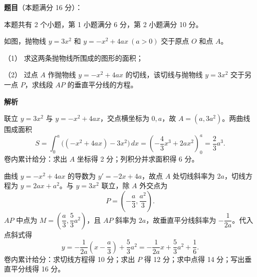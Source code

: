 \begin{answer}

\textbf{题目}（本题满分 16 分）：

本题共有 2 个小题，第 1 小题满分 6 分，第 2 小题满分 10 分。

如图，抛物线 $y=3x^2$ 和 $y=-x^2+4ax\ (a>0)$ 交于原点 $O$ 和点 $A$。

（1） 求这两条抛物线所围成的图形的面积；

（2） 过点 $A$ 作抛物线 $y=-x^2+4ax$ 的切线，该切线与抛物线 $y=3x^2$ 交于另一点 $P$，求线段 $AP$ 的垂直平分线的方程。
\nopagebreak[4]
\begin{center}\end{center}
\nopagebreak[4]
\textbf{解析}


联立 $y=3x^2$ 与 $y=-x^2+4ax$，交点横坐标为 $0,a$，故 $A=(a,3a^2)$。两曲线围成面积
\nopagebreak[4]
\[
S=\int_0^a\bigl((-x^2+4ax)-3x^2\bigr)\,dx
=\left(-\frac43x^3+2ax^2\right)_0^a=\frac23a^3.
\]
卷内累计给分：求出 $A$ 坐标得 2 分；列积分并求面积得 6 分。


曲线 $y=-x^2+4ax$ 的导数为 $y'=-2x+4a$，故点 $A$ 处切线斜率为 $2a$，切线方程为 $y=2ax+a^2$。与 $y=3x^2$ 联立，除 $A$ 外交点为
\nopagebreak[4]
\[
P=\left(-\frac a3,\frac{a^2}{3}\right).
\]
$AP$ 中点为 $M=(\dfrac a3,\dfrac53a^2)$，且 $AP$ 斜率为 $2a$，故垂直平分线斜率为 $-\dfrac1{2a}$。代入点斜式得
\nopagebreak[4]
\[
y=-\frac1{2a}\left(x-\frac a3\right)+\frac53a^2
=-\frac1{2a}x+\frac53a^2+\frac16.
\]
卷内累计给分：求切线方程得 10 分；求出 $P$ 得 12 分；求中点得 14 分；写出垂直平分线得 16 分。



\end{answer}

